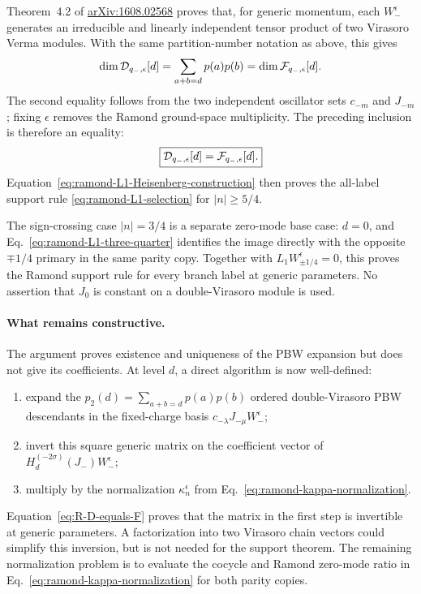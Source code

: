 \documentclass[11pt]{article}
\begin{document}
Theorem~4.2 of
\href{https://arxiv.org/abs/1608.02568}{arXiv:1608.02568} proves that, for
generic momentum, each \(W_-^\epsilon\) generates an irreducible and
linearly independent tensor product of two Virasoro Verma modules.  With
the same partition-number notation as above, this gives
\begin{equation}
 \dim {\cal D}_{q_-,\epsilon}[d]
 =\sum_{a+b=d}p(a)p(b)
 =\dim {\cal F}_{q_-,\epsilon}[d].
\end{equation}
The second equality follows from the two independent oscillator sets
\(c_{-m}\) and \(J_{-m}\); fixing \(\epsilon\) removes the Ramond ground-space
multiplicity.  The preceding inclusion is therefore an equality:
\begin{equation}
 \boxed{
 {\cal D}_{q_-,\epsilon}[d]
 ={\cal F}_{q_-,\epsilon}[d].}
 \label{eq:R-D-equals-F}
\end{equation}
Equation~\eqref{eq:ramond-L1-Heisenberg-construction} then proves the
all-label support rule \eqref{eq:ramond-L1-selection} for
\(|n|\geq5/4\).

The sign-crossing case \(|n|=3/4\) is a separate zero-mode base case:
\(d=0\), and Eq.~\eqref{eq:ramond-L1-three-quarter} identifies the image
directly with the opposite \(\mp1/4\) primary in the same parity copy.
Together with \(L_1W_{\pm1/4}^\epsilon=0\), this proves the Ramond support
rule for every branch label at generic parameters.  No assertion that
\(J_0\) is constant on a double-Virasoro module is used.

\paragraph{What remains constructive.}
The argument proves existence and uniqueness of the PBW expansion but does
not give its coefficients.  At level \(d\), a direct algorithm is now
well-defined:
\begin{enumerate}
 \item expand the \(p_2(d)=\sum_{a+b=d}p(a)p(b)\) ordered
 double-Virasoro PBW descendants in the fixed-charge basis
 \(c_{-\lambda}J_{-\mu}W_-^\epsilon\);
 \item invert this square generic matrix on the coefficient vector of
 \(H_d^{(-2\sigma)}(J_-)W_-^\epsilon\);
 \item multiply by the normalization \(\kappa_n^\epsilon\) from
 Eq.~\eqref{eq:ramond-kappa-normalization}.
\end{enumerate}
Equation~\eqref{eq:R-D-equals-F} proves that the matrix in the first step is
invertible at generic parameters.  A factorization into two Virasoro chain
vectors could simplify this inversion, but is not needed for the support
theorem.  The remaining normalization problem is to evaluate the cocycle
and Ramond zero-mode ratio in Eq.~\eqref{eq:ramond-kappa-normalization} for
both parity copies.
\end{document}

